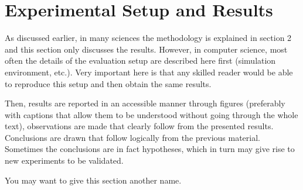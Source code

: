 \section{Experimental Setup and Results}
As discussed earlier, in many sciences the methodology is explained in section 2 and this section only discusses the results. 
However, in computer science, most often the details of the evaluation setup are described here first (simulation environment, etc.).
Very important here is that any skilled reader would be able to reproduce this setup and then obtain the same results.

Then, results are reported in an accessible manner through figures (preferably with captions that allow them to be understood without going through the whole text), observations are made that clearly follow from the presented results.
Conclusions are drawn that follow logically from the previous material.
Sometimes the conclusions are in fact hypotheses, which in turn may give rise to new experiments to be validated.

You may want to give this section another name.